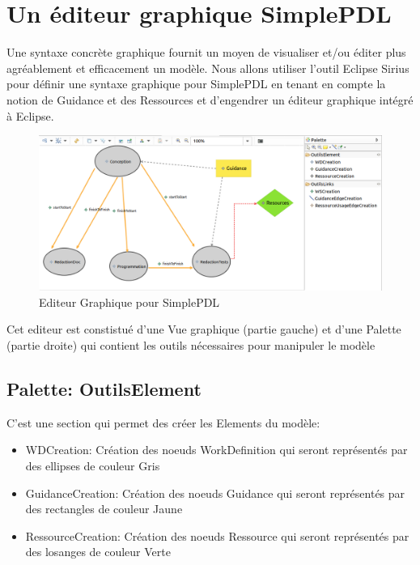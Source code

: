 \documentclass{article}
\begin{document}
\section{Un éditeur graphique SimplePDL}
Une syntaxe concrète graphique fournit un moyen de visualiser et/ou éditer plus agréablement et efficacement un modèle. Nous allons utiliser l’outil Eclipse Sirius pour définir une syntaxe graphique pour SimplePDL en tenant en compte la notion de Guidance et des Ressources et d’engendrer un éditeur graphique intégré à Eclipse.

\begin{figure}[H]
    \centering
    \includegraphics[width = 18cm]{SiriusGraphic.png}
    \caption{Editeur Graphique pour SimplePDL}
\end{figure}


Cet editeur est constistué d'une Vue graphique (partie gauche) et d'une Palette (partie droite) qui contient les outils nécessaires pour manipuler le modèle 

\subsection{Palette: OutilsElement}
C'est une section qui permet des créer les Elements du modèle:

\begin{itemize}
\item WDCreation: Création des noeuds WorkDefinition qui seront représentés par des ellipses de couleur Gris

\item GuidanceCreation: Création des noeuds Guidance qui seront représentés par des rectangles de couleur Jaune

\item RessourceCreation: Création des noeuds Ressource qui seront représentés par des losanges de couleur  Verte

\end{itemize}
\end{document}

